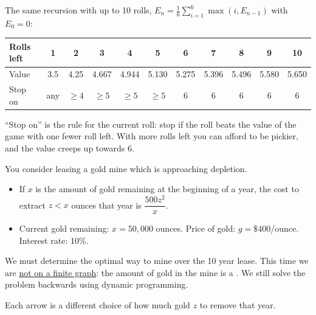 \begin{example}
    The same recursion with up to 10 rolls, $E_n = \frac{1}{6}\sum_{i=1}^{6}\max(i, E_{n-1})$ with $E_0 = 0$:
    \begin{center}
    \begin{tabular}{lcccccccccc}
        \toprule
        Rolls left & 1 & 2 & 3 & 4 & 5 & 6 & 7 & 8 & 9 & 10\\
        \midrule
        Value & 3.5 & 4.25 & 4.667 & 4.944 & 5.130 & 5.275 & 5.396 & 5.496 & 5.580 & 5.650\\
        Stop on & any & $\geq 4$ & $\geq 5$ & $\geq 5$ & $\geq 5$ & 6 & 6 & 6 & 6 & 6\\
        \bottomrule
    \end{tabular}
    \end{center}
    ``Stop on'' is the rule for the current roll: stop if the roll beats the value of the game with one fewer roll left. With more rolls left you can afford to be pickier, and the value creeps up towards 6.
\end{example}

You consider leasing a gold mine which is approaching depletion.
\begin{itemize}
    \item If $x$ is the amount of gold remaining at the beginning of a year, the cost to extract $z < x$ ounces that year is $\dfrac{500z^2}{x}$.
    \item Current gold remaining: $x = 50{,}000$ ounces. Price of gold: $g = \$400$/ounce. Interest rate: 10\%.
\end{itemize}

We must determine the optimal way to mine over the 10 year lease. This time we are \ul{not on a finite graph}: the amount of gold in the mine is a . We still solve the problem backwards using dynamic programming.

\begin{center}
\end{center}
Each arrow is a different choice of how much gold $z$ to remove that year.

